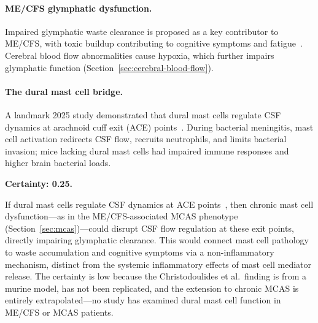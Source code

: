 \paragraph{ME/CFS glymphatic dysfunction.}
Impaired glymphatic waste clearance is proposed as a key contributor to ME/CFS, with toxic buildup contributing to cognitive symptoms and fatigue~\cite{Perrin2025glymphatic}. Cerebral blood flow abnormalities cause hypoxia, which further impairs glymphatic function (Section~\ref{sec:cerebral-blood-flow}).

\paragraph{The dural mast cell bridge.}
A landmark 2025 study demonstrated that dural mast cells regulate CSF dynamics at arachnoid cuff exit (ACE) points~\cite{Christodoulides2024meningitis}. During bacterial meningitis, mast cell activation redirects CSF flow, recruits neutrophils, and limits bacterial invasion; mice lacking dural mast cells had impaired immune responses and higher brain bacterial loads.

\begin{speculation}
\label{spec:mcas-glymphatic}
\textbf{Certainty: 0.25.}

If dural mast cells regulate CSF dynamics at ACE points~\cite{Christodoulides2024meningitis}, then chronic mast cell dysfunction---as in the ME/CFS-associated MCAS phenotype (Section~\ref{sec:mcas})---could disrupt CSF flow regulation at these exit points, directly impairing glymphatic clearance. This would connect mast cell pathology to waste accumulation and cognitive symptoms via a non-inflammatory mechanism, distinct from the systemic inflammatory effects of mast cell mediator release. The certainty is low because the Christodoulides et al.\ finding is from a murine model, has not been replicated, and the extension to chronic MCAS is entirely extrapolated---no study has examined dural mast cell function in ME/CFS or MCAS patients.
\end{speculation}

